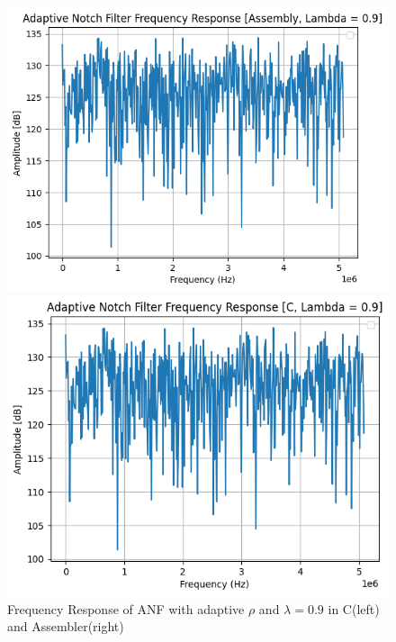\begin{figure}[ht]
    \centering
    \begin{minipage}{0.475\columnwidth}
        \includegraphics[width=\linewidth]{images/Adaptive_Notch_Filter_Assy_Frequency_Response_L9.png}
    \end{minipage}\hfill
    \begin{minipage}{0.475\columnwidth}
        \includegraphics[width=\linewidth]{images/Adaptive_Notch_Filter_C_Frequency_Response.png}
    \end{minipage}\hfill
    \caption{Frequency Response of ANF with adaptive $\rho$ and $\lambda = 0.9$ in C(left) and Assembler(right)}
    \label{fig:adaptive_frequency_response}
\end{figure}


